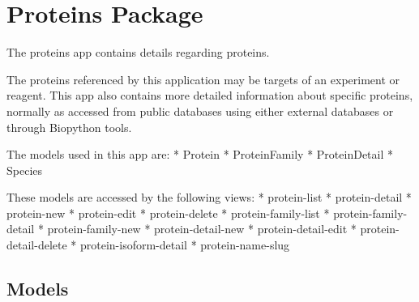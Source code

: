 \documentclass[letterpaper,10pt,english]{sphinxmanual}
\begin{document}
\section{Proteins Package}
\label{api:module-experimentdb.proteins}\label{api:proteins-package}
The proteins app contains details regarding proteins.


The proteins referenced by this application may be targets of an experiment or reagent.  This app also contains more detailed information about specific proteins, normally as accessed from public databases using either external databases or through Biopython tools.


The models used in this app are:
* Protein
* ProteinFamily
* ProteinDetail
* Species


These models are accessed by the following views:
* protein-list
* protein-detail
* protein-new
* protein-edit
* protein-delete
* protein-family-list
* protein-family-detail
* protein-family-new
* protein-detail-new
* protein-detail-edit
* protein-detail-delete
* protein-isoform-detail
* protein-name-slug



\subsection{Models}
\label{api:id13}\label{api:module-experimentdb.proteins.models}
\end{document}
